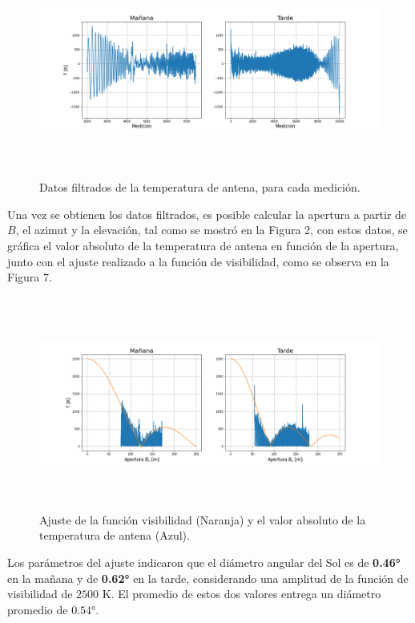 \documentclass[letterpaper,oneside]{article}
\begin{document}
\begin{figure}
  \centering
  \includegraphics[height=7cm]{../graficos/cleandata.png}
  \caption{Datos filtrados de la temperatura de antena, para cada medición.}
\end{figure}

Una vez se obtienen los datos filtrados, es posible calcular la apertura a partir de $B$, el azimut y la elevación, tal como se mostró en la Figura 2, con estos datos, se gráfica el valor absoluto de la temperatura de antena en función de la apertura, junto con el ajuste realizado a la función de visibilidad, como se observa en la Figura 7.

\begin{figure}
  \centering
  \includegraphics[height=7cm]{../graficos/ajuste.png}
  \caption{Ajuste de la función visibilidad (Naranja) y el valor absoluto de la temperatura de antena (Azul).}
\end{figure}

Los parámetros del ajuste indicaron que el diámetro angular del Sol es de \textbf{0.46°} en la mañana y de \textbf{0.62°} en la tarde, considerando una amplitud de la función de visibilidad de $2500$ K. El promedio de estos dos valores entrega un diámetro promedio de $0.54°$.
\end{document}
